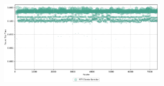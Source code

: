 \begin{apendicesenv}
\begin{figure}[htbp!]
\begin{subfigure}[t]{0.5\textwidth}
        \includegraphics[width=1\textwidth, height=120pt]{USPSC-img/output/cropped/1-mitm_arp-rttp.png}
    \end{subfigure}%
\end{figure}


\end{apendicesenv}
